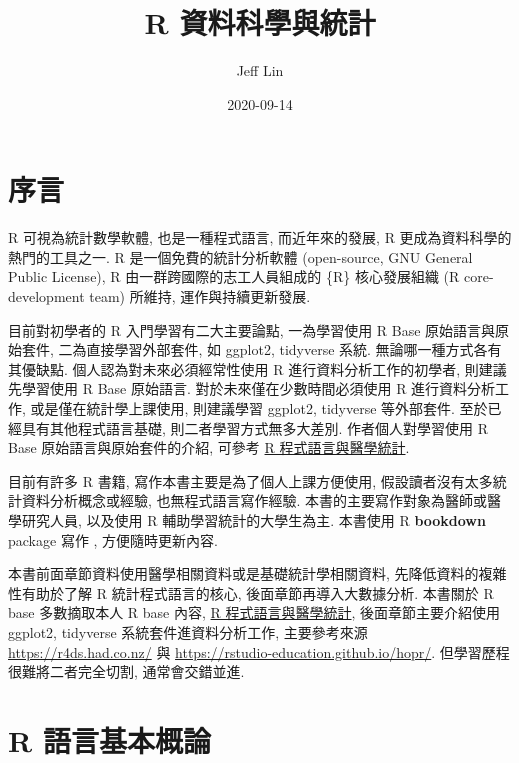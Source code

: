 \documentclass[
]{book}
\title{R 資料科學與統計}
\author{Jeff Lin}
\date{2020-09-14}
\begin{document}
\maketitle

{
\setcounter{tocdepth}{1}
\tableofcontents
}
\hypertarget{ux5e8fux8a00}{%
\chapter*{序言}\label{ux5e8fux8a00}}

R 可視為統計數學軟體, 也是一種程式語言,
而近年來的發展, R 更成為資料科學的熱門的工具之一.
R 是一個免費的統計分析軟體 (open-source, GNU General Public License),
R 由一群跨國際的志工人員組成的 \{R\} 核心發展組織 (R core-development team) 所維持, 運作與持續更新發展.

目前對初學者的 R 入門學習有二大主要論點,
一為學習使用 R Base 原始語言與原始套件,
二為直接學習外部套件, 如 ggplot2, tidyverse 系統.
無論哪一種方式各有其優缺點.
個人認為對未來必須經常性使用 R 進行資料分析工作的初學者,
則建議先學習使用 R Base 原始語言.
對於未來僅在少數時間必須使用 R 進行資料分析工作,
或是僅在統計學上課使用,
則建議學習 ggplot2, tidyverse 等外部套件.
至於已經具有其他程式語言基礎, 則二者學習方式無多大差別.
作者個人對學習使用 R Base 原始語言與原始套件的介紹, 可參考
\href{https://www.jefflinmd.com/book/rintro/}{R 程式語言與醫學統計}.

目前有許多 R 書籍, 寫作本書主要是為了個人上課方便使用,
假設讀者沒有太多統計資料分析概念或經驗,
也無程式語言寫作經驗.
本書的主要寫作對象為醫師或醫學研究人員,
以及使用 R 輔助學習統計的大學生為主.
本書使用 R \textbf{bookdown} package 寫作 \citep{R-bookdown}, 方便隨時更新內容.

本書前面章節資料使用醫學相關資料或是基礎統計學相關資料,
先降低資料的複雜性有助於了解 R 統計程式語言的核心,
後面章節再導入大數據分析.
本書關於 R base 多數摘取本人 R base 內容,
\href{https://www.jefflinmd.com/book/rintro/}{R 程式語言與醫學統計},
後面章節主要介紹使用 ggplot2, tidyverse 系統套件進資料分析工作,
主要參考來源 \url{https://r4ds.had.co.nz/} 與 \url{https://rstudio-education.github.io/hopr/}.
但學習歷程很難將二者完全切割,
通常會交錯並進.

\hypertarget{intro}{%
\chapter{R 語言基本概論}\label{intro}}
\end{document}
